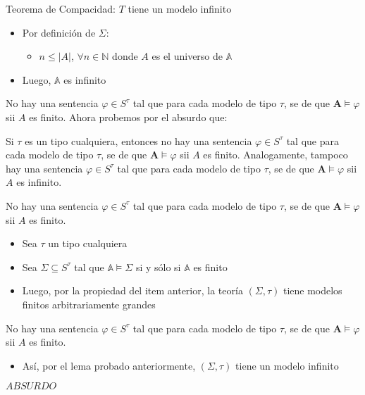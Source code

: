 \documentclass[10pt]{beamer}
\newcommand{\Cfontc}{\fontsize{10.7}{9.5}\selectfont}
\begin{document}
\begin{frame}{Teorema de Compacidad: $T$ tiene un modelo infinito}
  \begin{itemize}[<+->]
    \item Por definición de $\Sigma$:
      \begin{itemize}
        \item $n \leq |A|$, $\forall n \in \mathbb{N}$ donde $A$ es el universo de $\mathbb{A}$
      \end{itemize}
    \item Luego, $\mathbb{A}$ es infinito
  \end{itemize}

\end{frame}

\begin{frame}{No hay una sentencia $\varphi \in
S^{\tau }$ tal que para cada modelo de tipo $\tau $, se de que $\mathbf{A}%
\vDash \varphi $ sii $A$ es finito.}
  Ahora probemos por el absurdo que:
  \begin{center}
    Si $\tau $ es un tipo cualquiera, entonces no hay una sentencia $\varphi \in
    S^{\tau }$ tal que para cada modelo de tipo $\tau $, se de que $\mathbf{A}%
    \vDash \varphi $ sii $A$ es finito. Analogamente, tampoco hay una sentencia $%
    \varphi \in S^{\tau }$ tal que para cada modelo de tipo $\tau $, se de que $%
    \mathbf{A}\vDash \varphi $ sii $A$ es infinito.

  \end{center}

\end{frame}


\begin{frame}{No hay una sentencia $\varphi \in
S^{\tau }$ tal que para cada modelo de tipo $\tau $, se de que $\mathbf{A}%
\vDash \varphi $ sii $A$ es finito.}
  \begin{itemize}[<+->]
    \item Sea $\tau$ un tipo cualquiera
    \item Sea $\Sigma \subseteq S^{\tau}$ tal que $\mathbb{A} \vDash \Sigma$
    si y sólo si $\mathbb{A}$ es finito
    \item Luego, por la propiedad del item anterior, la teoría $(\Sigma, \tau)$ tiene
    modelos finitos arbitrariamente grandes
  \end{itemize}
\end{frame}

\begin{frame}{No hay una sentencia $\varphi \in
S^{\tau }$ tal que para cada modelo de tipo $\tau $, se de que $\mathbf{A}%
\vDash \varphi $ sii $A$ es finito.}
  \begin{itemize}
    \item Así, por el lema probado anteriormente, $(\Sigma, \tau)$ tiene un modelo infinito
  \end{itemize}
  \pause
  \begin{center}
    \Cfontc $ABSURDO$
  \end{center}
\end{frame}
\end{document}
